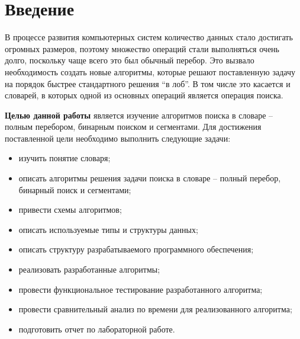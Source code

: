 \chapter*{Введение}

В процессе развития компьютерных систем количество данных стало достигать огромных размеров, поэтому множество операций стали выполняться очень долго, поскольку чаще всего это был обычный перебор. Это вызвало необходимость создать новые алгоритмы, которые решают поставленную задачу на порядок быстрее стандартного решения “в лоб”. В том числе это касается и словарей, в которых одной из основных операций является операция поиска.


\textbf{Целью данной работы} является изучение алгоритмов поиска в словаре -- полным перебором, бинарным поиском и сегментами.
Для достижения поставленной цели необходимо выполнить следующие задачи:
\begin{itemize}
	\item изучить понятие словаря;
    \item описать алгоритмы решения задачи поиска в словаре -- полный перебор, бинарный поиск и сегментами;
    \item привести схемы алгоритмов;
    \item описать используемые типы и структуры данных;
    \item описать структуру разрабатываемого программного обеспечения;
    \item реализовать разработанные алгоритмы;
    \item провести функциональное тестирование разработанного алгоритма;
    \item провести сравнительный анализ по времени для реализованного алгоритма;
    \item подготовить отчет по лабораторной работе.
\end{itemize}
